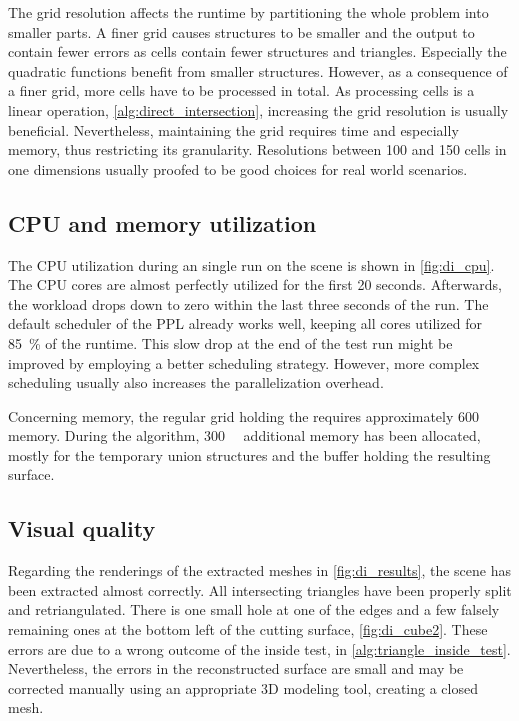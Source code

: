 The grid resolution affects the runtime by partitioning the whole problem into smaller parts.
A finer grid causes structures to be smaller and the output to contain fewer errors as cells contain fewer structures and triangles.
Especially the quadratic functions benefit from smaller structures.
However, as a consequence of a finer grid, more cells have to be processed in total.
As processing cells is a linear operation, \cf \cref{alg:direct_intersection}, increasing the grid resolution is usually beneficial.
Nevertheless, maintaining the grid requires time and especially memory, thus restricting its granularity.
Resolutions between 100 and 150 cells in one dimensions usually proofed to be good choices for real world scenarios.


\subsection{CPU and memory utilization}

The CPU utilization during an single run on the \impeller scene is shown in \cref{fig:di_cpu}.
The CPU cores are almost perfectly utilized for the first 20 seconds.
Afterwards, the workload drops down to zero within the last three seconds of the run.
The default scheduler of the PPL already works well, keeping all cores utilized for \SI{85}{\percent} of the runtime.
This slow drop at the end of the test run might be improved by employing a better scheduling strategy.
However, more complex scheduling usually also increases the parallelization overhead.

Concerning memory, the regular grid holding the \impeller requires approximately \SI{600}{\mebi\byte} memory.
During the algorithm, \SI{300}{\mebi\byte} additional memory has been allocated, mostly for the temporary union structures and the buffer holding the resulting surface.


\subsection{Visual quality}

Regarding the renderings of the extracted meshes in \cref{fig:di_results}, the \cubes scene has been extracted almost correctly.
All intersecting triangles have been properly split and retriangulated.
There is one small hole at one of the edges and a few falsely remaining ones at the bottom left of the cutting surface, \cf \cref{fig:di_cube2}.
These errors are due to a wrong outcome of the inside test, \cf {} in \cref{alg:triangle_inside_test}.
Nevertheless, the errors in the reconstructed surface are small and may be corrected manually using an appropriate 3D modeling tool, creating a closed mesh.

